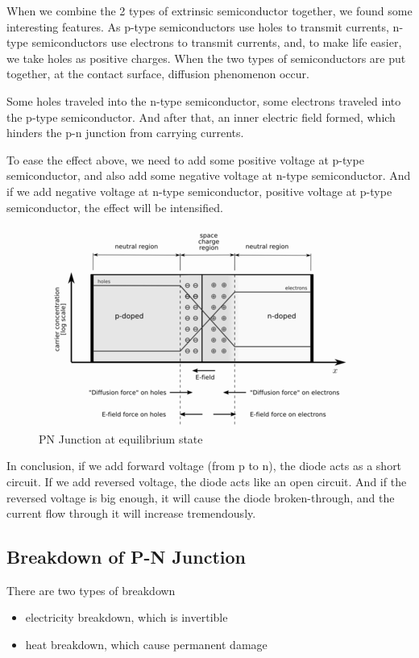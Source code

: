 When we combine the 2 types of extrinsic semiconductor together, we found some interesting features. As p-type semiconductors use holes to transmit currents, n-type semiconductors use electrons to transmit currents, and, to make life easier, we take holes as positive charges. When the two types of semiconductors are put together, at the contact surface, diffusion phenomenon occur.

Some holes traveled into the n-type semiconductor, some electrons traveled into the p-type semiconductor. And after that, an inner electric field formed, which hinders the p-n junction from carrying currents.

To ease the effect above, we need to add some positive voltage at p-type semiconductor, and also add some negative voltage at n-type semiconductor. And if we add negative voltage at n-type semiconductor, positive voltage at p-type semiconductor, the effect will be intensified.

\begin{figure}[H]
  \centering
  \includegraphics[width=0.5\linewidth]{figures/Pn-junction-equilibrium.png}
  \caption{PN Junction at equilibrium state}
\end{figure}

In conclusion, if we add forward voltage (from p to n), the diode acts as a short circuit. If we add reversed voltage, the diode acts like an open circuit. And if the reversed voltage is big enough, it will cause the diode broken-through, and the current flow through it will increase tremendously.

\subsection{Breakdown of P-N Junction}

There are two types of breakdown

\begin{itemize}
\item electricity breakdown, which is invertible
\item heat breakdown, which cause permanent damage
\end{itemize}

